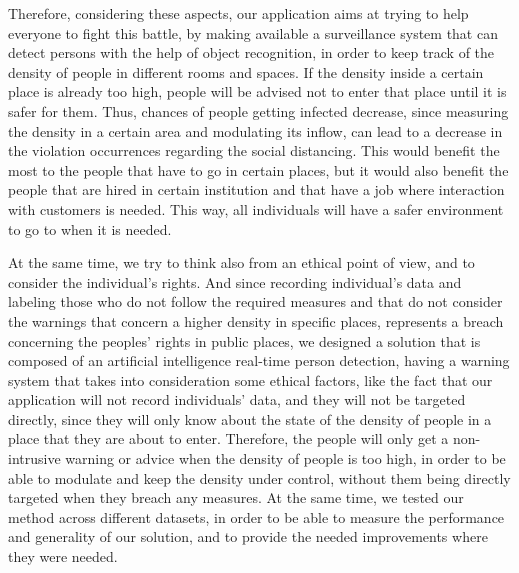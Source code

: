 \documentclass[runningheads,a4paper,11pt]{report}
\begin{document}
Therefore, considering these aspects, our application aims at trying to help everyone to fight this battle, by making available a surveillance system that can detect persons with the help of object recognition, in order to keep track of the density of people in different rooms and spaces. If the density inside a certain place is already too high, people will be advised not to enter that place until it is safer for them. Thus, chances of people getting infected decrease, since measuring the density in a certain area and modulating its inflow, can lead to a decrease in the violation occurrences regarding the social distancing. This would benefit the most to the people that have to go in certain places, but it would also benefit the people that are hired in certain institution and that have a job where interaction with customers is needed. This way, all individuals will have a safer environment to go to when it is needed.

At the same time, we try to think also from an ethical point of view, and to consider the individual's rights. And since recording individual's data and labeling those who do not follow the required measures and that do not consider the warnings that concern a higher density in specific places, represents a breach concerning the peoples' rights in public places, we designed a solution that is composed of an artificial intelligence real-time person detection, having a warning system that takes into consideration some ethical factors, like the fact that our application will not record individuals' data, and they will not be targeted directly, since they will only know about the state of the density of people in a place that they are about to enter. Therefore, the people will only get a non-intrusive warning or advice when the density of people is too high, in order to be able to modulate and keep the density under control, without them being directly targeted when they breach any measures.
At the same time, we tested our method across different datasets, in order to be able to measure the performance and generality of our solution, and to provide the needed improvements where they were needed.
\end{document}
